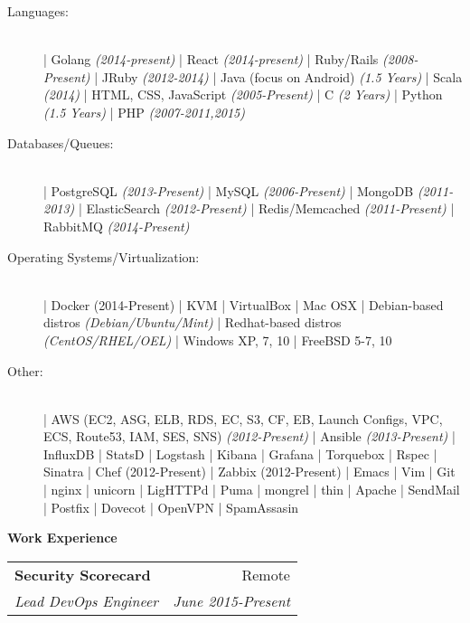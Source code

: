 \documentclass[a4paper,11pt,sans]{article}
\makeatletter
\newcommand{\resheading}[1]{{\large \colorbox{myblue}{\begin{minipage}{\textwidth}{\textbf{#1 \vphantom{p\^{E}}}}\end{minipage}}}}
\newcommand{\ressubheading}[4]{
\begin{tabular*}{7.0in}{l@{\extracolsep{\fill}}r}
		\textbf{#1} & #2 \\
		\textit{#3} & \textit{#4} \\
\end{tabular*}\vspace{-6pt}}
\makeatother
\begin{document}
\begin{description}
    \item[Languages:] \hfill \\
        | Golang \textit{(2014-present)}
        | React \textit{(2014-present)}
        | Ruby/Rails \textit{(2008-Present)}
        | JRuby \textit{(2012-2014)}
        | Java (focus on Android) \textit{(1.5 Years)}
        | Scala \textit{(2014)}
        | HTML, CSS, JavaScript \textit{(2005-Present)}
        | C \textit{(2 Years)}
        | Python \textit{(1.5 Years)}
        | PHP \textit{(2007-2011,2015)}
    \item[Databases/Queues:] \hfill  \\
        | PostgreSQL \textit{(2013-Present)}
        | MySQL \textit{(2006-Present)}
        | MongoDB \textit{(2011-2013)}
        | ElasticSearch \textit{(2012-Present)}
        | Redis/Memcached \textit{(2011-Present)}
        | RabbitMQ \textit{(2014-Present)}
    \item[Operating Systems/Virtualization:] \hfill \\
        | Docker (2014-Present)
        | KVM
        | VirtualBox
        | Mac OSX
        | Debian-based distros \textit{(Debian/Ubuntu/Mint)}
        | Redhat-based distros \textit{(CentOS/RHEL/OEL)}
        | Windows XP, 7, 10
        | FreeBSD 5-7, 10
    \item[Other:] \hfill \\
        | AWS (EC2, ASG, ELB, RDS, EC, S3, CF, EB, Launch Configs, VPC, ECS, Route53, IAM, SES, SNS) \textit{(2012-Present)}
        | Ansible \textit{(2013-Present)}
        | InfluxDB
        | StatsD
        | Logstash
        | Kibana
        | Grafana
        | Torquebox
        | Rspec
        | Sinatra
        | Chef (2012-Present)
        | Zabbix (2012-Present)
        | Emacs
        | Vim
        | Git
        | nginx
        | unicorn
        | LigHTTPd
        | Puma
        | mongrel
        | thin
        | Apache
        | SendMail
        | Postfix
        | Dovecot
        | OpenVPN
        | SpamAssasin

\end{description}

\resheading{\color{white} Work Experience}

\ressubheading{Security Scorecard}{Remote}{Lead DevOps Engineer}{June 2015-Present}

\hspace{5pt} \\
\end{document}
